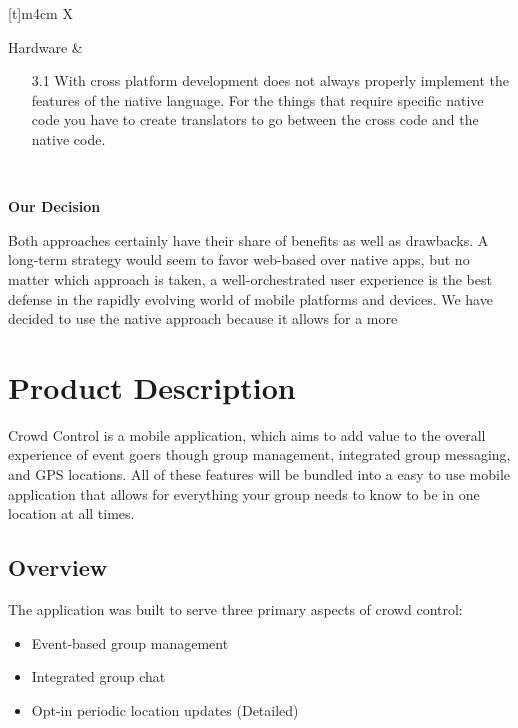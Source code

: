 \begin{center}
\begin{tabularx}{\textwidth}[t]{m{4cm} X}
\hline
{} \\
\hline

Hardware &
\begin{minipage}[t]{\linewidth}%
\begin{itemize}
\item[3.1] With cross platform development does not always properly implement the features of the native language. For the things that require specific native code you have to create translators to go between the cross code and the native code.
\end{itemize} 
\end{minipage}\\


\end{tabularx}
\end{center}

\noindent
\textbf{Our Decision}

Both approaches certainly have their share of benefits as well as drawbacks. A long-term strategy would seem to favor web-based over native apps, but no matter which approach is taken, a well-orchestrated user experience is the best defense in the rapidly evolving world of mobile platforms and devices. We have decided to use the native approach because it allows for a more 

\section{Product Description}

Crowd Control is a mobile application, which aims to add value to the overall experience of event goers though group management, integrated group messaging, and GPS locations. All of these features will be bundled into a easy to use mobile application that allows for everything your group needs to know to be in one location at all times.

\subsection{Overview}

The application was built to serve three primary aspects of crowd control: 
\begin{itemize}
\item Event-based group management
\item Integrated group chat
\item Opt-in periodic location updates
         (Detailed)
\end{itemize}

